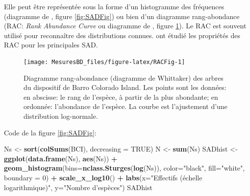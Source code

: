 \documentclass[
  11pt,
  french,
  a4paper,
  extrafontsizes,onecolumn,openright
  ]{memoir}
\newenvironment{Shaded}{\begin{snugshade}}{\end{snugshade}}
\newcommand{\DataTypeTok}[1]{\textcolor[rgb]{0.13,0.29,0.53}{#1}}
\newcommand{\DecValTok}[1]{\textcolor[rgb]{0.00,0.00,0.81}{#1}}
\newcommand{\KeywordTok}[1]{\textcolor[rgb]{0.13,0.29,0.53}{\textbf{#1}}}
\newcommand{\NormalTok}[1]{#1}
\newcommand{\OperatorTok}[1]{\textcolor[rgb]{0.81,0.36,0.00}{\textbf{#1}}}
\newcommand{\OtherTok}[1]{\textcolor[rgb]{0.56,0.35,0.01}{#1}}
\newcommand{\StringTok}[1]{\textcolor[rgb]{0.31,0.60,0.02}{#1}}
\begin{document}
\normalsize

Elle peut être représentée sous la forme d'un histogramme des fréquences (diagramme de \textcite{Preston1948}, figure \ref{fig:SADFig}) ou bien d'un diagramme rang-abondance (RAC: \emph{Rank Abundance Curve} ou diagramme de \textcite{Whittaker1965}, figure \ref{fig:RACFig}).
Le RAC est souvent utilisé pour reconnaître des distributions connues.
\textcite{Izsak2012} ont étudié les propriétés des RAC pour les principales SAD.



\scriptsize

\begin{figure}

{\centering \texttt{[image: MesuresBD\_files/figure-latex/RACFig-1]} 

}

\caption{Diagramme rang-abondance (diagramme de Whittaker) des arbres du dispositif de Barro Colorado Island. Les points sont les données: en abscisse: le rang de l'espèce, à partir de la plus abondante; en ordonnée: l'abondance de l'espèce. La courbe est l'ajustement d'une distribution log-normale.}\label{fig:RACFig}
\end{figure}

\normalsize

Code de la figure \ref{fig:SADFig}:

\scriptsize

\begin{Shaded}
\begin{Highlighting}[]
\NormalTok{Ns <-}\StringTok{ }\KeywordTok{sort}\NormalTok{(}\KeywordTok{colSums}\NormalTok{(BCI), }\DataTypeTok{decreasing =} \OtherTok{TRUE}\NormalTok{)}
\NormalTok{N <-}\StringTok{ }\KeywordTok{sum}\NormalTok{(Ns)}
\NormalTok{SADhist <-}\StringTok{ }\KeywordTok{ggplot}\NormalTok{(}\KeywordTok{data.frame}\NormalTok{(Ns), }\KeywordTok{aes}\NormalTok{(Ns)) }\OperatorTok{+}\StringTok{ }
\StringTok{  }\KeywordTok{geom_histogram}\NormalTok{(}\DataTypeTok{bins=}\KeywordTok{nclass.Sturges}\NormalTok{(}\KeywordTok{log}\NormalTok{(Ns)), }
       \DataTypeTok{color=}\StringTok{"black"}\NormalTok{, }\DataTypeTok{fill=}\StringTok{"white"}\NormalTok{, }\DataTypeTok{boundary =} \DecValTok{0}\NormalTok{) }\OperatorTok{+}
\StringTok{  }\KeywordTok{scale_x_log10}\NormalTok{() }\OperatorTok{+}
\StringTok{  }\KeywordTok{labs}\NormalTok{(}\DataTypeTok{x=}\StringTok{"Effectifs (échelle logarithmique)"}\NormalTok{, }
       \DataTypeTok{y=}\StringTok{"Nombre d'espèces"}\NormalTok{)}
\NormalTok{SADhist}
\end{Highlighting}
\end{Shaded}
\end{document}
